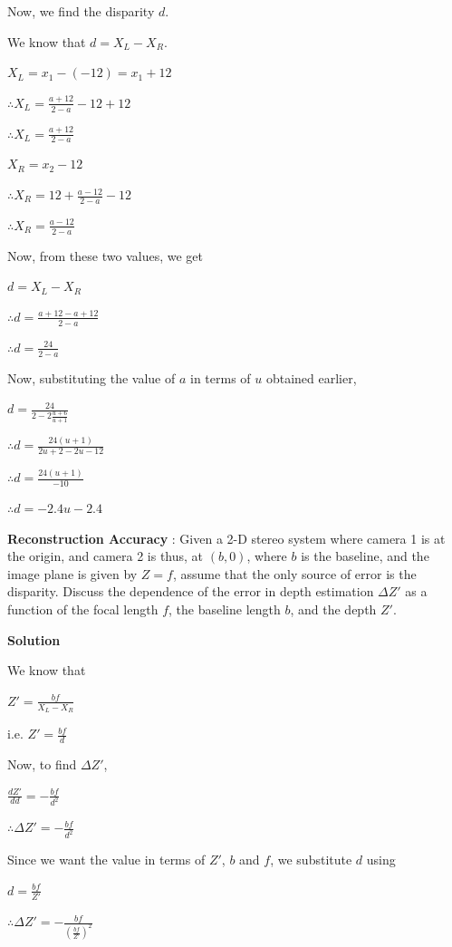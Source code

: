 \documentclass{assignment}
\begin{document}
\begin{problemlist}
\begin{legal}
Now, we find the disparity $d$.

We know that $d = X_L - X_R$.

$X_L = x_1 - (-12) = x_1 + 12$

$\therefore X_L = \frac{a + 12}{2 - a} - 12 + 12$

$\therefore X_L = \frac{a + 12}{2 - a}$

$X_R = x_2 - 12$

$\therefore X_R = 12 + \frac{a - 12}{2 - a} - 12$

$\therefore X_R = \frac{a - 12}{2 - a}$

Now, from these two values, we get

$d = X_L - X_R$

$\therefore d = \frac{a + 12 - a + 12}{2 - a}$

$\therefore d = \frac{24}{2 - a}$

Now, substituting the value of $a$ in terms of $u$ obtained earlier,

$d = \frac{24}{2 - 2\frac{u + 6}{u + 1}}$

$\therefore d = \frac{24(u + 1)}{2u + 2 - 2u - 12}$

$\therefore d = \frac{24(u + 1)}{-10}$

$\therefore d = -2.4u - 2.4$

\end{legal}

\pbitem \textbf{Reconstruction Accuracy} : Given a 2-D stereo system where camera 1 is at the origin, and camera 2 is thus, at $(b, 0)$, where $b$ is the baseline, and the image plane is given by $Z = f$, assume that the only source of error is the disparity. Discuss the dependence of the error in depth estimation $\Delta Z'$ as a function of the focal length $f$, the baseline length $b$, and the depth $Z'$.

\textbf{Solution}

We know that

$Z' = \frac{bf}{X_L - X_R}$

i.e. $Z' = \frac{bf}{d}$

Now, to find $\Delta Z'$,

$\frac{dZ'}{dd} = -\frac{bf}{d^2}$

$\therefore \Delta Z' = -\frac{bf}{d^2}$

Since we want the value in terms of $Z'$, $b$ and $f$, we substitute $d$ using 

$d = \frac{bf}{Z'}$

$\therefore \Delta Z' = -\frac{bf}{(\frac{bf}{Z'})^2}$


\end{problemlist}
\end{document}

